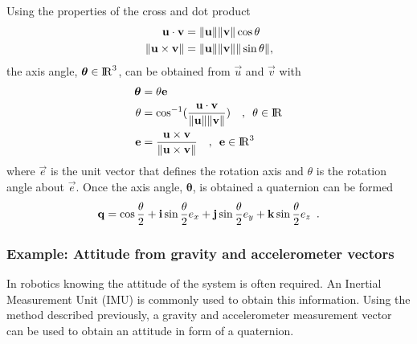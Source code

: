 Using the properties of the cross and dot product
%
\begin{align}
  {\mathbf{u}} \cdot {\mathbf{v}} &=
    {\|{\mathbf{u}}\|} {\|{\mathbf{v}}\|} \cos \theta \\
  {\|{\mathbf{u}} \times {\mathbf{v}}\|} &=
    {\|{\mathbf{u}}\|} {\|{\mathbf{v}}\|} {\|\sin \theta\|} ,
\end{align}
%
the axis angle, $\boldsymbol{\theta} \in {\rm I\!R}^{3}$, can be obtained from
$\Vec{u}$ and $\Vec{v}$ with
%
\begin{align}
  \boldsymbol{\theta} &= \theta {\mathbf{e}} \\
  \label{eq:angle_axis_calc_angle}
  \theta &= \cos^{-1}(
    \dfrac{{\mathbf{u}} \cdot {\mathbf{v}}}
          {{\|{\mathbf{u}}\|} {\|{\mathbf{v}}\|}}
  ) \quad , \enspace \theta \in {\rm I\!R} \\
  \label{eq:angle_axis_calc_axis}
  {\mathbf{e}} &=
    \dfrac{{\mathbf{u}} \times {\mathbf{v}}}{{\|{\mathbf{u}} \times {\mathbf{v}}\|}}
    \quad , \enspace {\mathbf{e}} \in {\rm I\!R}^{3}
\end{align}
%
where $\Vec{e}$ is the unit vector that defines the rotation axis and $\theta$
is the rotation angle about $\Vec{e}$. Once the axis angle,
$\boldsymbol{\theta}$, is obtained a quaternion can be formed
%
\begin{equation}
  \label{eq:quaternion_from_axis_angles}
  {{\mathbf{q}}} =
    \cos \dfrac{\theta}{2}
    + {\mathbf{i}} \sin \dfrac{\theta}{2} e_{x}
    + {\mathbf{j}} \sin \dfrac{\theta}{2} e_{y}
    + {\mathbf{k}} \sin \dfrac{\theta}{2} e_{z} \enspace .
\end{equation}


\subsubsection{Example: Attitude from gravity and accelerometer vectors}

In robotics knowing the attitude of the system is often required. An Inertial
Measurement Unit (IMU) is commonly used to obtain this information. Using the
method described previously, a gravity and accelerometer measurement vector
can be used to obtain an attitude in form of a quaternion.

